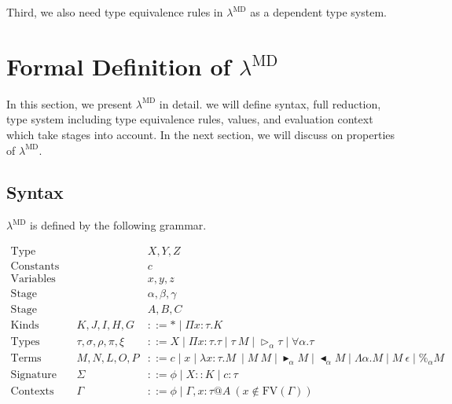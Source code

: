\documentclass[runningheads]{llncs}
\newcommand{\LMD}{$\lambda^{\textrm{MD}}$\xspace}
\newcommand{\G}{\Gamma}
\newcommand{\TW}{\triangleright}
\newcommand{\F}{\forall}
\newcommand{\TB}{\blacktriangleright}
\newcommand{\TBL}{\blacktriangleleft}
\begin{document}

Third, we also need type equivalence rules in \LMD as a dependent type system.


\section{Formal Definition of \LMD}

In this section, we present \LMD in detail. we will define syntax, full reduction, type system including type equivalence rules, values, and evaluation context which take stages into account.
In the next section, we will discuss on properties of \LMD.

\subsection{Syntax}

\LMD is defined by the following grammar.

\begin{align*}
    \textrm{Type variables}  &  &                          & X,Y,Z                                                                             \\
    \textrm{Constants}       &  &                          & c                                                                                 \\
    \textrm{Variables}       &  &                          & x,y,z                                                                             \\
    \textrm{Stage variables} &  &                          & \alpha,\beta,\gamma                                                               \\
    \textrm{Stage}           &  &                          & A,B,C                                                                             \\
    \textrm{Kinds}           &  & K,J,I,H,G                & ::= * \mid \Pi x:\tau.K                                                           \\
    \textrm{Types}           &  & \tau,\sigma,\rho,\pi,\xi & ::= X \mid \Pi x:\tau.\tau \mid \tau\ M \mid \TW_{\alpha} \tau \mid \F\alpha.\tau \\
    \textrm{Terms}           &  & M,N,L,O,P                & ::= c \mid x \mid \lambda x:\tau.M\ \mid M\ M \mid \TB_\alpha M 
    \mid \TBL_\alpha M \mid \Lambda\alpha.M \mid M\ \epsilon \mid \%_\alpha M                                                                  \\ 
    \textrm{Signature}       &  & \Sigma                   & ::= \phi \mid X::K \mid c:\tau                                                    \\
    \textrm{Contexts}        &  & \Gamma                   & ::= \phi \mid  \Gamma,x:\tau@A\ (x\not\in\textrm{FV}(\G))                         \\
\end{align*}
\end{document}
